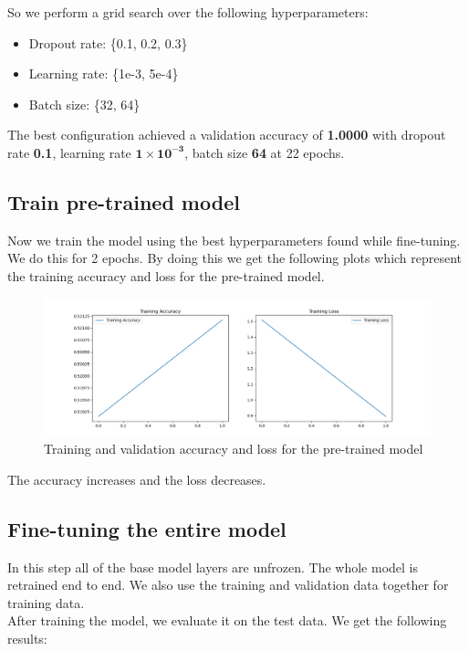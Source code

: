 \documentclass[conference]{IEEEtran}
\begin{document}
So we perform a grid search over the following hyperparameters:
\begin{itemize}
	\item Dropout rate: \{0.1, 0.2, 0.3\}
	\item Learning rate: \{1e-3, 5e-4\}
	\item Batch size: \{32, 64\}
\end{itemize}

The best configuration achieved a validation accuracy of \textbf{1.0000} with dropout rate \textbf{0.1}, learning rate \(\mathbf{1\times10^{-3}}\), batch size \textbf{64} at 22 epochs.


\subsection{Train pre-trained model}
Now we train the model using the best hyperparameters found while fine-tuning. We do this for 2 epochs.
By doing this we get the following plots which represent the training accuracy and loss for the pre-trained model.

\begin{figure}[htbp]
	\centerline{\includegraphics[width=\linewidth]{Images/Transferlearning_2.png}}
	\caption{Training and validation accuracy and loss for the pre-trained model}
	\label{fig:transferlearning_2}
\end{figure}

The accuracy increases and the loss decreases.

\subsection{Fine-tuning the entire model}
In this step all of the base model layers are unfrozen. The whole model is retrained end to end. We also use the training and validation data together for training data.\\

After training the model, we evaluate it on the test data. We get the following results:\\
\end{document}
